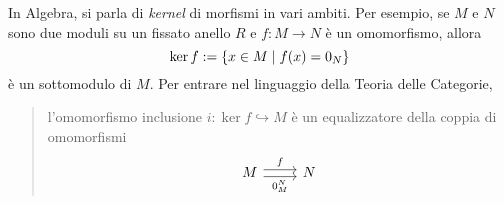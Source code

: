 \begin{example}\label{example:KernelInModR}
  In Algebra, si parla di {\em kernel} di morfismi in vari ambiti. Per
  esempio, se \(M\) e \(N\) sono due moduli su un fissato anello \(R\)
  e \(f : M \to N\) è un omomorfismo, allora
  \[
    \ker f := \left\{x \in M \mid f(x) = 0_N\right\}
  \]
  è un sottomodulo di \(M\). Per entrare nel linguaggio della {\sc
    Teoria delle Categorie},
  \begin{quotation}
    l'omomorfismo inclusione \(i : \ker f \hookrightarrow M\) è un equalizzatore
    della coppia di omomorfismi
    \[
      \begin{tikzcd}
        M \ar["f", shift left, r] \ar["{0_M^N}", shift right, swap, r]
        & N
      \end{tikzcd}
    \]
  \end{quotation}
\end{example}

